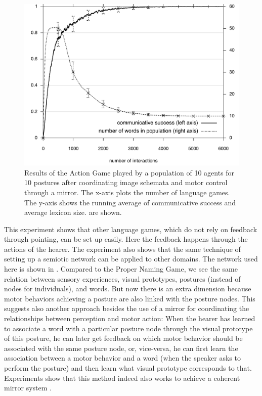 \begin{figure}
\centerline{\includegraphics[width=0.6\linewidth]{chap11/figs/commsuccess}}
\caption{\label{commsuccess} \footnotesize{Results of the Action Game played by a population of 10 agents 
for 10 postures after coordinating image schemata and motor control through a mirror. 
The x-axis plots the number of language games. The y-axis shows the running average of 
communicative success and average lexicon size. 
are shown.}}
\end{figure}

This experiment shows that other language games, which do not rely on feedback through pointing, can be set up easily. 
Here the feedback happens through the actions of the hearer. The experiment also shows
that the same technique of setting up a semiotic network can be applied to other domains. 
The network used here is shown in . Compared to the Proper Naming Game, we see the same relation between 
sensory experiences, visual prototypes, postures (instead of nodes for individuals), 
and words. But now there is an extra dimension because motor behaviors 
achieving a posture are also linked with the posture nodes. This suggests also another approach besides the use of a mirror 
for coordinating the relationships between perception and motor action: When the hearer has learned to associate a word with a particular
posture node through the visual prototype of this posture, he can later get feedback on which motor behavior should be 
associated with the same posture node, or, vice-versa, he can first learn the association between a motor behavior and 
a word (when the speaker asks to perform the posture) and then learn what visual prototype corresponds to that. 
Experiments show that this method indeed also works to achieve a coherent mirror system \cite{Steels:2008}.


